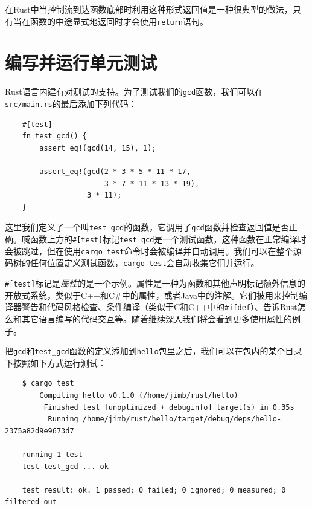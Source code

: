 在Rust中当控制流到达函数底部时利用这种形式返回值是一种很典型的做法，只有当在函数的中途显式地返回时才会使用\texttt{return}语句。

\section{编写并运行单元测试}
Rust语言内建有对测试的支持。为了测试我们的\texttt{gcd}函数，我们可以在\texttt{src/main.rs}的最后添加下列代码：
\begin{verbatim}
    #[test]
    fn test_gcd() {
        assert_eq!(gcd(14, 15), 1);

        assert_eq!(gcd(2 * 3 * 5 * 11 * 17,
                       3 * 7 * 11 * 13 * 19),
                   3 * 11);
    }
\end{verbatim}

这里我们定义了一个叫\texttt{test\_gcd}的函数，它调用了\texttt{gcd}函数并检查返回值是否正确。喊函数上方的\texttt{\#[test]}标记\texttt{test\_gcd}是一个测试函数，这种函数在正常编译时会被跳过，但在使用\texttt{cargo test}命令时会被编译并自动调用。我们可以在整个源码树的任何位置定义测试函数，\texttt{cargo test}会自动收集它们并运行。

\texttt{\#[test]}标记是\emph{属性}的是一个示例。属性是一种为函数和其他声明标记额外信息的开放式系统，类似于C++和C\#中的属性，或者Java中的注解。它们被用来控制编译器警告和代码风格检查、条件编译（类似于C和C++中的\texttt{\#ifdef}）、告诉Rust怎么和其它语言编写的代码交互等。随着继续深入我们将会看到更多使用属性的例子。

把\texttt{gcd}和\texttt{test\_gcd}函数的定义添加到\texttt{hello}包里之后，我们可以在包内的某个目录下按照如下方式运行测试：
\begin{verbatim}
    $ cargo test
        Compiling hello v0.1.0 (/home/jimb/rust/hello)
         Finished test [unoptimized + debuginfo] target(s) in 0.35s
          Running /home/jimb/rust/hello/target/debug/deps/hello-2375a82d9e9673d7

    running 1 test
    test test_gcd ... ok
    
    test result: ok. 1 passed; 0 failed; 0 ignored; 0 measured; 0 filtered out
\end{verbatim}

